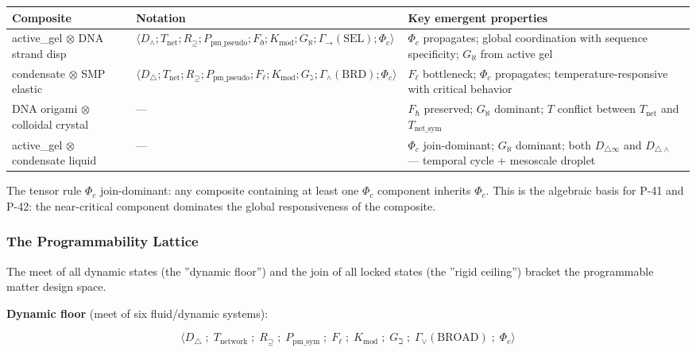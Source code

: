 \documentclass[12pt,a4paper]{article}
\begin{document}
\begin{table}[htbp]
\centering
\small
{}
\begin{tabularx}{\textwidth}{>{\centering\arraybackslash}X >{\centering\arraybackslash}X >{\centering\arraybackslash}X}
\toprule
\rowcolor{gray!25}\textbf{Composite} & \textbf{Notation} & \textbf{Key emergent properties} \\
\midrule
\rowcolors{1}{white}{gray!10}
active\_gel $\otimes$ DNA strand disp & $\langle D_\wedge; T_\text{net}; R_{\supseteq}; P_{\text{pm\_pseudo}}; F_\eth; K_\text{mod}; G_{\aleph}; \Gamma_\to(\text{SEL}); \Phi_c \rangle$ & $\Phi_c$ propagates; global coordination with sequence specificity; $G_{\aleph}$ from active gel \\
condensate $\otimes$ SMP elastic & $\langle D_\triangle; T_\text{net}; R_{\supseteq}; P_{\text{pm\_pseudo}}; F_\ell; K_\text{mod}; G_{\gimel}; \Gamma_\wedge(\text{BRD}); \Phi_c \rangle$ & $F_\ell$ bottleneck; $\Phi_c$ propagates; temperature-responsive with critical behavior \\
DNA origami $\otimes$ colloidal crystal & --- & $F_\hbar$ preserved; $G_{\aleph}$ dominant; $T$ conflict between $T_\text{net}$ and $T_{\text{net\_sym}}$ \\
active\_gel $\otimes$ condensate liquid & --- & $\Phi_c$ join-dominant; $G_{\aleph}$ dominant; both $D_{\triangle\infty}$ and $D_{\triangle\wedge}$ --- temporal cycle + mesoscale droplet \\
\bottomrule
\end{tabularx}
\end{table}

The tensor rule $\Phi_c$ join-dominant: any composite containing at least one $\Phi_c$ component inherits $\Phi_c$. This is the algebraic basis for P-41 and P-42: the near-critical component dominates the global responsiveness of the composite.

\subsubsection{The Programmability Lattice}

The meet of all dynamic states (the ''dynamic floor'') and the join of all locked states (the ''rigid ceiling'') bracket the programmable matter design space.

\textbf{Dynamic floor} (meet of six fluid/dynamic systems):

\[\langle D_\triangle \;;\; T_\text{network} \;;\; R_{\supseteq} \;;\; P_{\text{pm\_sym}} \;;\; F_\ell \;;\; K_\text{mod} \;;\; G_\beth \;;\; \Gamma_\vee(\text{BROAD}) \;;\; \Phi_c \rangle\]
\end{document}
